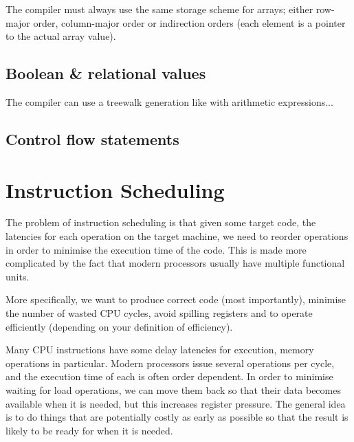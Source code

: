 The compiler must always use the same storage scheme for arrays;
either row-major order, column-major order or indirection orders (each
element is a pointer to the actual array value).


\subsection{Boolean \& relational values}

The compiler can use a treewalk generation like with arithmetic
expressions...


\subsection{Control flow statements}




\section{Instruction Scheduling}

The problem of instruction scheduling is that given some target code,
the latencies for each operation on the target machine, we need to
reorder operations in order to minimise the execution time of the
code. This is made more complicated by the fact that modern processors
usually have multiple functional units.

More specifically, we want to produce correct code (most importantly),
minimise the number of wasted CPU cycles, avoid spilling registers and
to operate efficiently (depending on your definition of efficiency).

Many CPU instructions have some delay latencies for execution, memory
operations in particular. Modern processors issue several operations
per cycle, and the execution time of each is often order dependent. In
order to minimise waiting for load operations, we can move them back
so that their data becomes available when it is needed, but this
increases register pressure. The general idea is to do things that are
potentially costly as early as possible so that the result is likely
to be ready for when it is needed.



